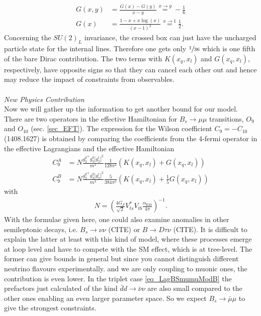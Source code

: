 \begin{align}
 G(x,y) &= \frac{G(x)-G(y)}{x-y}\stackrel{x\rightarrow y}{=} -\frac16\\
 G(x)&=\frac{1-x+x\log(x)}{(x-1)^2} \stackrel{x\rightarrow 1}{=} \frac12.
\end{align}
Concerning the $SU(2)_L$ invariance, the crossed box can just have the uncharged particle state for the internal lines. Therefore one gets only $\sfrac{1}{36}$
which is one fifth of the bare Dirac contribution. The two terms with $K(x_q,x_l)$ and $G(x_q,x_l)$, respectively, have opposite signs so that they can cancel
each other out and hence may reduce the impact of constraints from observables.\\
\\ \textit{New Physics Contribution}\\
\noindent Now we will gather up the information to get another bound for our model. There are two operators in the effective Hamiltonian for $B_s\rightarrow \mu\mu$
transitions, $O_9$ and $O_{10}$ (sec. \ref{sec_EFT}). The expression for the Wilson coefficient $C_9 = -C_{10}$ (1408.1627) is obtained by comparing the 
coefficients from the 4-fermi operator in the effective Lagrangians and the effective Hamiltonian
\begin{align}
 C_9^A &= N \frac{g_2^{q*}g_3^q|g_2^l|^2}{m^2} \frac{1}{128\pi^2} \left(K(x_q,x_l) + G(x_q,x_l)\right)\\
 C_9^B &= N \frac{g_2^{q*}g_3^q|g_2^l|^2}{m^2} \frac{5}{384\pi^2} \left(K(x_q,x_l) + \frac15 G(x_q,x_l)\right)
\end{align}
with
\begin{align}
 N = \left(\frac{4G_F}{\sqrt{2}} V_{ts}^*V_{tb} \frac{\alpha_\text{EM}}{4\pi}\right)^{-1}.
\end{align}
With the formulae given here, one could also examine anomalies in other semileptonic decays, i.e. $B_s \rightarrow \nu\nu$ (CITE) or $B \rightarrow D\tau\nu$ (CITE). 
It is difficult to explain the latter at least with this kind of model, where these processes emerge at loop level and have to compete with the 
SM effect, which is at tree-level. The former can give bounds in general but since you cannot distinguish different neutrino flavours experimentally.
and we are only coupling to muonic ones, the contribution is even lower. In the triplet case \eqref{eq_LagBSmumuModB} the prefactors just calculated 
of the kind $\bar dd\rightarrow \bar\nu\nu$
are also small compared to the other ones enabling an even larger parameter space. So we expect $B_s\rightarrow \bar \mu \mu$ to give the strongest 
constraints.
 


%  
